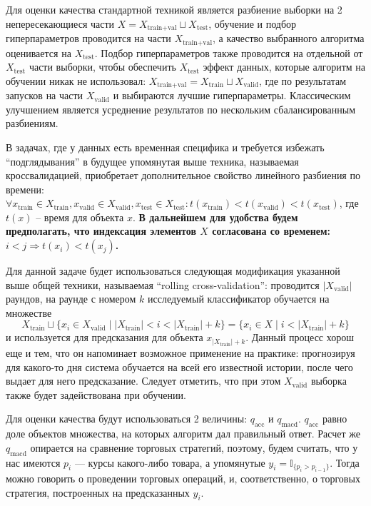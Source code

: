 \documentclass[14pt,a4paper]{extreport}
\begin{document}
Для оценки качества стандартной техникой является разбиение выборки на 2 непересекающиеся части
$X = X_\text{train+val} \sqcup X_\text{test}$, обучение и подбор гиперпараметров проводится на части $X_\text{train+val}$,
а качество выбранного алгоритма оценивается на $X_\text{test}$.
Подбор гиперпараметров также проводится на отдельной от $X_\text{test}$ части выборки, чтобы обеспечить $X_\text{test}$ эффект
данных, которые алгоритм на обучении никак не использовал:
$X_\text{train+val} = X_\text{train} \sqcup X_\text{valid}$, где по результатам
запусков на части $X_\text{valid}$ и выбираются лучшие гиперпараметры. Классическим улучшением является усреднение результатов
по нескольким сбалансированным разбиениям.

В задачах, где у данных есть временная специфика и требуется избежать ``подглядывания'' в будущее упомянутая выше техника,
называемая кроссвалидацией, приобретает дополнительное свойство линейного разбиения по времени:
$\forall x_\text{train}\in X_\text{train}, x_\text{valid}\in X_\text{valid}, x_\text{test}\in X_\text{test}:
t(x_\text{train} ) < t(x_\text{valid} ) < t(x_\text{test} )$, где $t(x)$ -- время для объекта $x$.
\textbf{В дальнейшем для удобства будем предполагать, что индексация элементов $X$ согласована со временем:
$i<j\Rightarrow t(x_i)<t(x_j)$.}

Для данной задаче будет использоваться следующая модификация указанной выше общей техники, называемая ``rolling cross-validation'':
проводится $|X_\text{valid}|$ раундов, на раунде с номером $k$ исследуемый классификатор обучается на множестве
\[X_\text{train} \sqcup \{x_i \in X_\text{valid} \mid |X_\text{train}| < i < |X_\text{train}| + k\} =
\{x_i\in X \mid i < |X_\text{train}| + k\} \]
и используется для предсказания для объекта $x_{|X_\text{train}|+k}$. Данный процесс хорош еще и тем, что он напоминает возможное применение
на практике: прогнозируя для какого-то дня система обучается на всей его известной истории, после чего
выдает для него предсказание. Следует отметить, что при этом $X_\text{valid}$ выборка также будет задействована при обучении.

Для оценки качества будут использоваться 2 величины: $q_\text{acc}$ и $q_\text{macd}$. $q_\text{acc}$ равно доле объектов
множества, на которых алгоритм дал правильный ответ. Расчет же $q_\text{macd}$ опирается на сравнение торговых стратегий,
поэтому, будем считать, что у нас имеются $p_i$ --- курсы какого-либо товара, а упомянутые
$y_i=\mathbb{I}_{\{p_i > p_{i-1}\}}$.
Тогда можно говорить о проведении торговых операций, и, соответственно, о торговых стратегия, построенных на предсказанных $y_i$.
\end{document}
